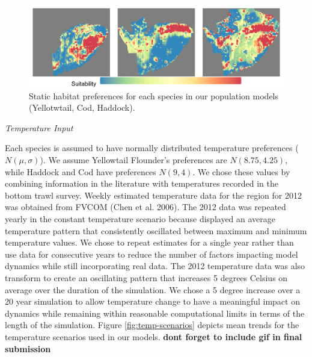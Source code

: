 \documentclass[
  12pt,
]{article}
\begin{document}
\begin{figure}

{\centering \includegraphics[width=0.95\linewidth]{Images/Habitat_3species} 

}

\caption{Static habitat preferences for each species in our population models (Yellotwtail, Cod, Haddock).}\label{fig:hab-plot}
\end{figure}

\emph{Temperature Input}

Each species is assumed to have normally distributed temperature preferences (\(N(\mu,\sigma)\)). We assume Yellowtail Flounder's preferences are \(N(8.75,4.25)\), while Haddock and Cod have preferences \(N(9,4)\). We chose these values by combining information in the literature with temperatures recorded in the bottom trawl survey. Weekly estimated temperature data for the region for 2012 was obtained from FVCOM (Chen et al. 2006). The 2012 data was repeated yearly in the constant temperature scenario because displayed an average temperature pattern that consistently oscillated between maximum and minimum temperature values. We chose to repeat estimates for a single year rather than use data for consecutive years to reduce the number of factors impacting model dynamics while still incorporating real data. The 2012 temperature data was also transform to create an oscillating pattern that increases 5 degrees Celsius on average over the duration of the simulation. We chose a 5 degree increase over a 20 year simulation to allow temperature change to have a meaningful impact on dynamics while remaining within reasonable computational limits in terms of the length of the simulation. Figure \ref{fig:temp-scenarios} depicts mean trends for the temperature scenarios used in our models. \textbf{dont forget to include gif in final submission}
\end{document}
